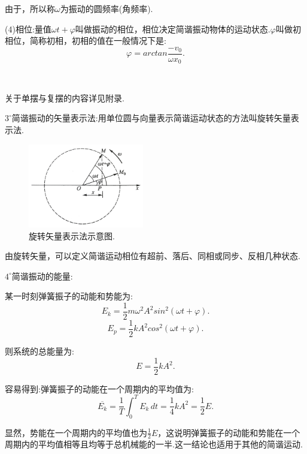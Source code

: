 \documentclass[UTF8]{ctexart}
\begin{document}
	由于，所以称$\omega$为振动的圆频率(角频率).

	(4)相位:量值$\omega t+\varphi $叫做振动的相位，相位决定简谐振动物体的运动状态.$\varphi$叫做初相位，简称初相，初相的值在一般情况下是:
	\begin{equation*}
		\varphi=arctan\frac{-v_0}{\omega x_0}.
	\end{equation*}

	~

	关于单摆与复摆的内容详见附录.

	$3^{\circ}$简谐振动的矢量表示法:用单位圆与向量表示简谐运动状态的方法叫旋转矢量表示法.
	\begin{figure}[h]
		\begin{center}
			\includegraphics[width=0.45\textwidth]{xuanzhuanshiliang}
			\caption{旋转矢量表示法示意图.}
		\end{center}
	\end{figure}

	由旋转矢量，可以定义简谐运动相位有超前、落后、同相或同步、反相几种状态.

	$4^{\circ}$简谐振动的能量:

	某一时刻弹簧振子的动能和势能为:
	\begin{equation*}
		E_k=\frac{1}{2}m\omega^2A^2sin^2(\omega t+\varphi).
	\end{equation*}
	\begin{equation*}
		E_p=\frac{1}{2}kA^2cos^2(\omega t+\varphi).
	\end{equation*}

	则系统的总能量为:
	\begin{equation*}
		E=\frac{1}{2}kA^2.
	\end{equation*}

	容易得到:弹簧振子的动能在一个周期内的平均值为:
	\begin{equation*}
		\overline{E_k}=\frac{1}{T}\int_{0}^{T}E_k \,dt=\frac{1}{4}kA^2=\frac{1}{2}E.
	\end{equation*}

	显然，势能在一个周期内的平均值也为$\frac{1}{2}E$，这说明弹簧振子的动能和势能在一个周期内的平均值相等且均等于总机械能的一半.这一结论也适用于其他的简谐运动.
\end{document}
